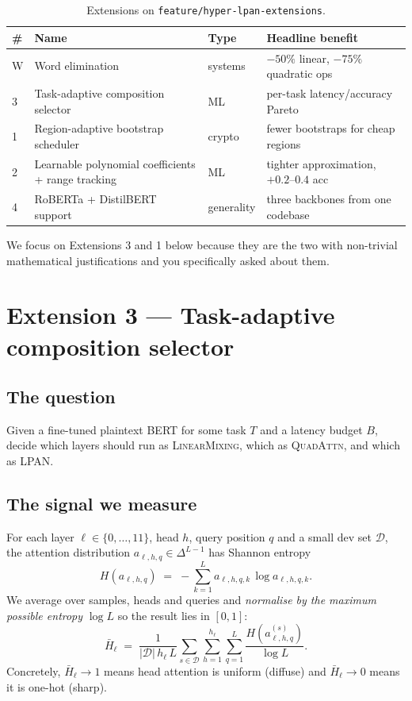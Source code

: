 \documentclass[11pt,a4paper]{article}
\newcommand{\LM}{\textsc{LinearMixing}}
\newcommand{\Quad}{\textsc{QuadAttn}}
\newcommand{\LPAN}{\textsc{LPAN}}
\begin{document}
\begin{table}[h]
\centering
\caption{Extensions on \texttt{feature/hyper-lpan-extensions}.}
\label{tab:exts}
\begin{tabular}{l l l l}
\toprule
\textbf{\#} & \textbf{Name} & \textbf{Type} & \textbf{Headline benefit} \\
\midrule
W & Word elimination & systems & $-50\%$ linear, $-75\%$ quadratic ops \\
3 & Task-adaptive composition selector & ML & per-task latency/accuracy Pareto \\
1 & Region-adaptive bootstrap scheduler & crypto & fewer bootstraps for cheap regions \\
2 & Learnable polynomial coefficients + range tracking & ML & tighter approximation, $+0.2$–$0.4$ acc \\
4 & RoBERTa + DistilBERT support & generality & three backbones from one codebase \\
\bottomrule
\end{tabular}
\end{table}

We focus on Extensions 3 and 1 below because they are the two with
non-trivial mathematical justifications and you specifically asked
about them.

\section{Extension 3 --- Task-adaptive composition selector}
\label{sec:ext3}

\subsection{The question}
Given a fine-tuned plaintext BERT for some task $T$ and a latency
budget $B$, decide which layers should run as \LM{}, which as
\Quad{}, and which as \LPAN{}.

\subsection{The signal we measure}
For each layer $\ell \in \{0,\dots,11\}$, head $h$, query position $q$
and a small dev set $\mathcal{D}$, the attention distribution
$a_{\ell,h,q}\in\Delta^{L-1}$ has Shannon entropy
\[
H(a_{\ell,h,q}) \;=\; -\sum_{k=1}^{L} a_{\ell,h,q,k}\,\log a_{\ell,h,q,k}.
\]
We average over samples, heads and queries and \emph{normalise by the
maximum possible entropy} $\log L$ so the result lies in $[0,1]$:
\[
\boxed{\;
\bar H_\ell \;=\; \frac{1}{|\mathcal{D}|\,h_\ell\,L}
                 \sum_{s\in\mathcal{D}}\sum_{h=1}^{h_\ell}\sum_{q=1}^{L}
                 \frac{H(a^{(s)}_{\ell,h,q})}{\log L}.
\;}
\]
Concretely, $\bar H_\ell \!\to\! 1$ means head attention is uniform
(diffuse) and $\bar H_\ell \!\to\! 0$ means it is one-hot (sharp).
\end{document}
